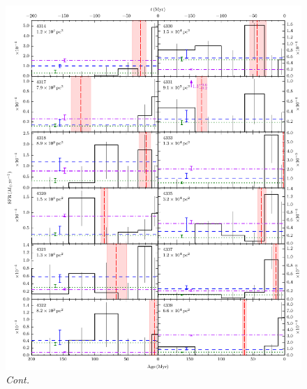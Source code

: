 \addtocounter{figure}{-1}
\begin{figure}
\begin{center}
\includegraphics[width=\textwidth]{uv_regions-figures/sfh_grid-4314-4339.pdf}
\caption{\textit{Cont.}}
\end{center}
\end{figure}

